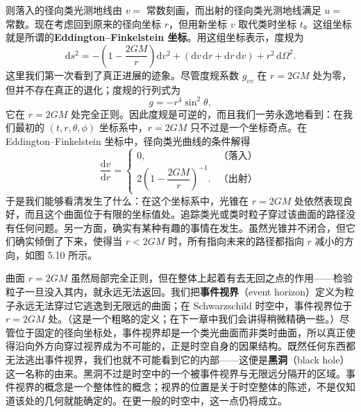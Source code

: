 则落入的径向类光测地线由 $v =$ 常数刻画，而出射的径向类光测地线满足 $u =$ 常数。现在考虑回到原来的径向坐标 $r$，但用新坐标 $v$ 取代类时坐标 $t$。这组坐标就是所谓的\textbf{Eddington--Finkelstein 坐标}。用这组坐标表示，度规为
\begin{equation*}
\mathrm{d}s^2 = -\left(1 - \frac{2GM}{r}\right)\mathrm{d}v^2 + \left(\mathrm{d}v\,\mathrm{d}r + \mathrm{d}r\,\mathrm{d}v\right) + r^2\,\mathrm{d}\Omega^2.
\tag{5.111}
\end{equation*}
这里我们第一次看到了真正进展的迹象。尽管度规系数 $g_{vv}$ 在 $r = 2GM$ 处为零，但并不存在真正的退化；度规的行列式为
\begin{equation*}
g = -r^4\sin^2\theta,
\tag{5.112}
\end{equation*}
它在 $r = 2GM$ 处完全正则。因此度规是可逆的，而且我们一劳永逸地看到：在我们最初的 $(t, r, \theta, \phi)$ 坐标系中，$r = 2GM$ 只不过是一个坐标奇点。在 Eddington--Finkelstein 坐标中，径向类光曲线的条件解得
\begin{equation*}
\frac{\mathrm{d}v}{\mathrm{d}r} =
\begin{cases}
0, & \text{（落入）}\\[6pt]
2\left(1 - \dfrac{2GM}{r}\right)^{-1}. & \text{（出射）}
\end{cases}
\tag{5.113}
\end{equation*}
于是我们能够看清发生了什么：在这个坐标系中，光锥在 $r = 2GM$ 处依然表现良好，而且这个曲面位于有限的坐标值处。追踪类光或类时粒子穿过该曲面的路径没有任何问题。另一方面，确实有某种有趣的事情在发生。虽然光锥并不闭合，但它们确实倾倒了下来，使得当 $r < 2GM$ 时，所有指向未来的路径都指向 $r$ 减小的方向，如图 5.10 所示。


曲面 $r = 2GM$ 虽然局部完全正则，但在整体上起着有去无回之点的作用——检验粒子一旦没入其内，就永远无法返回。我们把\textbf{事件视界}（event horizon）定义为粒子永远无法穿过它逃逸到无限远的曲面；在 Schwarzschild 时空中，事件视界位于 $r = 2GM$ 处。（这是一个粗略的定义；在下一章中我们会讲得稍微精确一些。）尽管位于固定的径向坐标处，事件视界却是一个类光曲面而非类时曲面，所以真正使得沿向外方向穿过视界成为不可能的，正是时空自身的因果结构。既然任何东西都无法逃出事件视界，我们也就不可能看到它的内部——这便是\textbf{黑洞}（black hole）这一名称的由来。黑洞不过是时空中的一个被事件视界与无限远分隔开的区域。事件视界的概念是一个整体性的概念；视界的位置是关于时空整体的陈述，不是仅知道该处的几何就能确定的。在更一般的时空中，这一点仍将成立。

